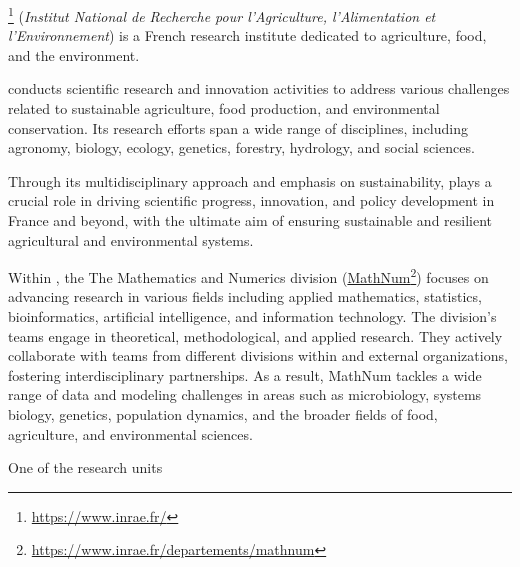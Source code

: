 \label{01_2_background_and_motivation}

\label{01_2_1_INRAE}

\href{https://www.inrae.fr/}{\INRAE}\footnote{\url{https://www.inrae.fr/}}  (\emph{Institut National de Recherche pour l'Agriculture, l'Alimentation et l'Environnement}) is a French research institute dedicated to agriculture, food, and the environment. 

\INRAE conducts scientific research and innovation activities to address various challenges related to sustainable agriculture, food production, and environmental conservation. Its research efforts span a wide range of disciplines, including agronomy, biology, ecology, genetics, forestry, hydrology, and social sciences.

Through its multidisciplinary approach and emphasis on sustainability, \INRAE plays a crucial role in driving scientific progress, innovation, and policy development in France and beyond, with the ultimate aim of ensuring sustainable and resilient agricultural and environmental systems.

Within \INRAE, the The Mathematics and Numerics division (\href{https://www.inrae.fr/departements/mathnum}{MathNum}\footnote{\url{https://www.inrae.fr/departements/mathnum}}) focuses on advancing research in various fields including applied mathematics, statistics, bioinformatics, artificial intelligence, and information technology. The division's teams engage in theoretical, methodological, and applied research. They actively collaborate with teams from different divisions within \INRAE and external organizations, fostering interdisciplinary partnerships. As a result, MathNum tackles a wide range of data and modeling challenges in areas such as microbiology, systems biology, genetics, population dynamics, and the broader fields of food, agriculture, and environmental sciences.

One of the research units